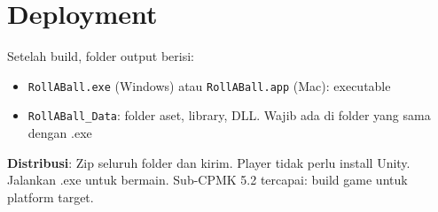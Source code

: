 \section{Deployment}

Setelah build, folder output berisi:
\begin{itemize}
  \item \texttt{RollABall.exe} (Windows) atau \texttt{RollABall.app} (Mac): executable
  \item \texttt{RollABall\_Data}: folder aset, library, DLL. Wajib ada di folder yang sama dengan .exe
\end{itemize}

\textbf{Distribusi}: Zip seluruh folder dan kirim. Player tidak perlu install Unity. Jalankan .exe untuk bermain. Sub-CPMK 5.2 tercapai: build game untuk platform target.
